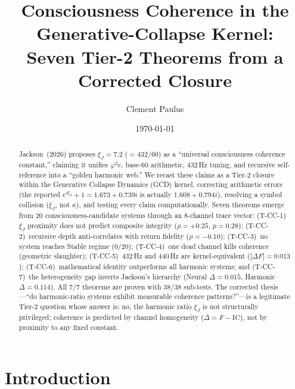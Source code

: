\documentclass[
  aps,
  prd,
  twocolumn,
  superscriptaddress,
  nofootinbib,
  floatfix
]{revtex4-2}
\newcommand{\IC}{\mathrm{IC}}
\newcommand{\xiJ}{\xi_J}
\begin{document}
\title{Consciousness Coherence in the Generative-Collapse Kernel:\\
Seven Tier-2 Theorems from a Corrected Closure}

\author{Clement Paulus}

\date{\today}

\begin{abstract}
Jackson~(2026) proposes $\xiJ = 7.2$ ($= 432/60$) as a ``universal
consciousness coherence constant,'' claiming it unifies $\varphi^2 e$,
base-60 arithmetic, 432\,Hz tuning, and recursive self-reference into a
``golden harmonic web.''  We recast these claims as a Tier-2 closure
within the Generative Collapse Dynamics (GCD) kernel, correcting
arithmetic errors (the reported $e^{i\xiJ}+1 = 1.673+0.739i$ is actually
$1.608+0.794i$), resolving a symbol collision ($\xiJ$, not $\kappa$),
and testing every claim computationally.  Seven theorems emerge from 20
consciousness-candidate systems through an 8-channel trace vector:
(T-CC-1)~$\xiJ$ proximity does not predict composite integrity
($\rho = +0.25$, $p = 0.28$);
(T-CC-2)~recursive depth anti-correlates with return fidelity
($\rho = -0.10$);
(T-CC-3)~no system reaches Stable regime (0/20);
(T-CC-4)~one dead channel kills coherence (geometric slaughter);
(T-CC-5)~432\,Hz and 440\,Hz are kernel-equivalent
($|\Delta F| = 0.013$);
(T-CC-6)~mathematical identity outperforms all harmonic systems; and
(T-CC-7)~the heterogeneity gap inverts Jackson's hierarchy
(Neural $\Delta = 0.015$, Harmonic $\Delta = 0.114$).
All 7/7 theorems are proven with 38/38 sub-tests.  The corrected
thesis---``do harmonic-ratio systems exhibit measurable coherence
patterns?''---is a legitimate Tier-2 question whose answer is: no,
the harmonic ratio $\xiJ$ is not structurally privileged; coherence
is predicted by channel homogeneity ($\Delta = F - \IC$), not by
proximity to any fixed constant.
\end{abstract}

\maketitle

\section{Introduction}
\end{document}
